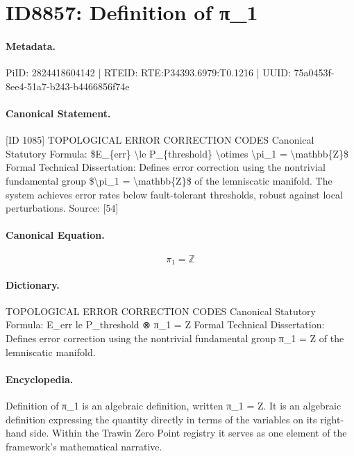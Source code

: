 \section*{ID8857: Definition of π\_1}
\paragraph{Metadata.}
PiID: 2824418604142 | RTEID: RTE:P34393.6979:T0.1216 | UUID: 75a0453f-8ee4-51a7-b243-b4466856f74e

\paragraph{Canonical Statement.}
[ID 1085] TOPOLOGICAL ERROR CORRECTION CODES Canonical Statutory Formula: \$E\_\{err\} \textbackslash{}le P\_\{threshold\} \textbackslash{}otimes \textbackslash{}pi\_1 = \textbackslash{}mathbb\{Z\}\$ Formal Technical Dissertation: Defines error correction using the nontrivial fundamental group \$\textbackslash{}pi\_1 = \textbackslash{}mathbb\{Z\}\$ of the lemniscatic manifold. The system achieves error rates below fault-tolerant thresholds, robust against local perturbations. Source: [54]

\paragraph{Canonical Equation.}
\[
\pi_1 = \mathbb{Z}
\]

\paragraph{Dictionary.}
TOPOLOGICAL ERROR CORRECTION CODES Canonical Statutory Formula: E\_err le P\_threshold ⊗ π\_1 = Z Formal Technical Dissertation: Defines error correction using the nontrivial fundamental group π\_1 = Z of the lemniscatic manifold.

\paragraph{Encyclopedia.}
Definition of π\_1 is an algebraic definition, written π\_1 = Z. It is an algebraic definition expressing the quantity directly in terms of the variables on its right-hand side. Within the Trawin Zero Point registry it serves as one element of the framework's mathematical narrative.

